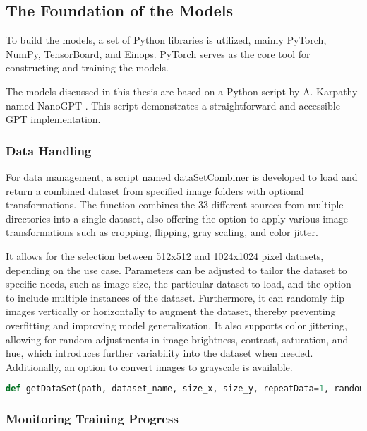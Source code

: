 
    \subsection{The Foundation of the Models}

    To build the models, a set of Python libraries is utilized, mainly PyTorch, NumPy, TensorBoard, and Einops. PyTorch serves as the core tool for constructing and training the models.
    
    The models discussed in this thesis are based on a Python script by A. Karpathy named NanoGPT \autocite{nanoGPTkarpathy2023}. This script demonstrates a straightforward and accessible GPT implementation. 
    
    \subsubsection{Data Handling}
    
    For data management, a script named dataSetCombiner is developed to load and return a combined dataset from specified image folders with optional transformations. The function combines the 33 different sources from multiple directories into a single dataset, also offering the option to apply various image transformations such as cropping, flipping, gray scaling, and color jitter.
    
    It allows for the selection between 512x512 and 1024x1024 pixel datasets, depending on the use case. Parameters can be adjusted to tailor the dataset to specific needs, such as image size, the particular dataset to load, and the option to include multiple instances of the dataset. Furthermore, it can randomly flip images vertically or horizontally to augment the dataset, thereby preventing overfitting and improving model generalization. It also supports color jittering, allowing for random adjustments in image brightness, contrast, saturation, and hue, which introduces further variability into the dataset when needed. Additionally, an option to convert images to grayscale is available.
    

\begin{lstlisting}[language=Python]
    def getDataSet(path, dataset_name, size_x, size_y, repeatData=1, random_vertical_flip=False, random_horizontal_flip=False, crop_type='random', grayscale=False, color_jitter=False, jitter_brightness=0, jitter_contrast=0, jitter_saturation=0, jitter_hue=0):
\end{lstlisting}

    \subsubsection{Monitoring Training Progress}
    
